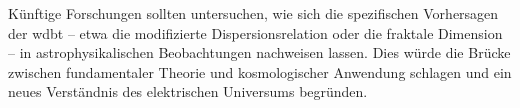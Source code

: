 Künftige Forschungen sollten untersuchen, wie sich die spezifischen Vorhersagen der \gls{wdbt} – etwa die modifizierte Dispersionsrelation oder die fraktale Dimension – in
astrophysikalischen Beobachtungen nachweisen lassen. Dies würde die Brücke zwischen fundamentaler Theorie und kosmologischer Anwendung schlagen und ein neues Verständnis des
elektrischen Universums begründen.
